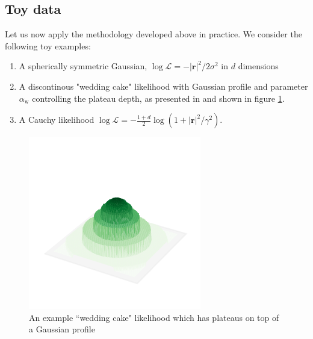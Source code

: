 \documentclass[usenatbib]{mnras} %
\newcommand{\Like}{\mathcal{L}}
\begin{document}
\subsection{Toy data}
Let us now apply the methodology developed above in practice. We consider the following toy examples:
\begin{enumerate}[leftmargin=0.3in, label=(\alph*)]
	\item A spherically symmetric Gaussian, $\log \Like = -|\bm{r}|^2/2\sigma^2$ in $d$ dimensions
	\item A discontinous "wedding cake" likelihood with Gaussian profile and parameter $\alpha_\mathrm{w}$ controlling the plateau depth, as presented in \cite{plateaus} and shown in figure \ref{fig:wedding_3d}.
	\item A Cauchy likelihood $\log \Like = - \frac{1 + d}{2} \log (1 + |\bm{r}|^2/\gamma^2)$.
\end{enumerate}
\begin{figure}
\begin{center}
	\includegraphics{figures/wedding_3d.pdf}
\end{center}
\caption{An example ``wedding cake" likelihood which has plateaus on top of a Gaussian profile}
\label{fig:wedding_3d}
\end{figure}
\end{document}
